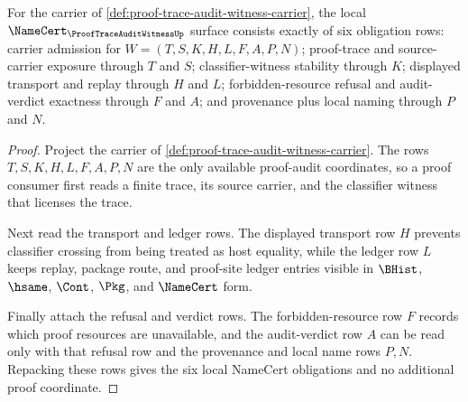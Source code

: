 \begin{theorem}
\label{thm:proof-trace-audit-witness-namecert-obligations}
For the carrier of \autoref{def:proof-trace-audit-witness-carrier}, the local $\NameCert_{\ProofTraceAuditWitnessUp}$ surface consists exactly of six obligation rows: carrier admission for $W=(T,S,K,H,L,F,A,P,N)$; proof-trace and source-carrier exposure through $T$ and $S$; classifier-witness stability through $K$; displayed transport and replay through $H$ and $L$; forbidden-resource refusal and audit-verdict exactness through $F$ and $A$; and provenance plus local naming through $P$ and $N$.
\end{theorem}
\begin{proof}
Project the carrier of \autoref{def:proof-trace-audit-witness-carrier}. The rows $T,S,K,H,L,F,A,P,N$ are the only available proof-audit coordinates, so a proof consumer first reads a finite trace, its source carrier, and the classifier witness that licenses the trace.

Next read the transport and ledger rows. The displayed transport row $H$ prevents classifier crossing from being treated as host equality, while the ledger row $L$ keeps replay, package route, and proof-site ledger entries visible in $\BHist$, $\hsame$, $\Cont$, $\Pkg$, and $\NameCert$ form.

Finally attach the refusal and verdict rows. The forbidden-resource row $F$ records which proof resources are unavailable, and the audit-verdict row $A$ can be read only with that refusal row and the provenance and local name rows $P,N$. Repacking these rows gives the six local NameCert obligations and no additional proof coordinate.
\end{proof}

